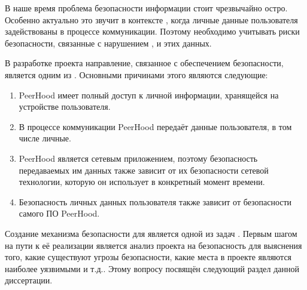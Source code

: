 %
В наше время проблема безопасности информации стоит чрезвычайно остро.
%
Особенно актуально это звучит в контексте , когда личные данные пользователя задействованы в процессе коммуникации.
%
Поэтому необходимо учитывать риски безопасности, связанные с нарушением ,  и  этих данных.

%
В разработке проекта  направление, связанное с обеспечением безопасности, является одним из  . 
%
Основными причинами этого являются следующие:
\begin{enumerate}

	\item PeerHood имеет полный доступ к личной информации, хранящейся на устройстве пользователя.

	\item В процессе коммуникации PeerHood передаёт данные пользователя, в том числе личные.

	\item PeerHood является сетевым приложением, поэтому безопасность передаваемых им данных также зависит от их безопасности сетевой технологии, которую он использует в конкретный момент времени.

	\item Безопасность личных данных пользователя также зависит от безопасности самого ПО PeerHood.
\end{enumerate}

%
Создание механизма безопасности для  является одной из  задач .
%
Первым шагом на пути к её реализации является анализ проекта на безопасность для выяснения того, какие существуют угрозы безопасности, какие места в проекте являются наиболее уязвимыми и т.д..
%
Этому вопросу посвящён следующий раздел данной диссертации.